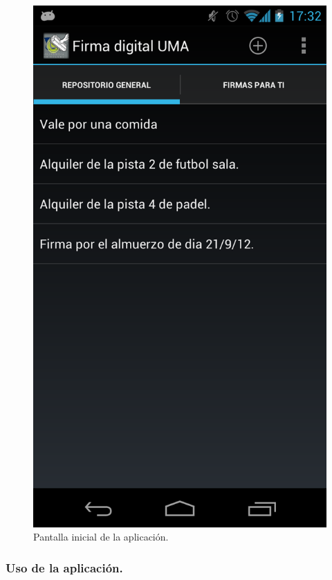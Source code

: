 \begin{figure}[h]
  \centering
    \includegraphics[scale=0.2]{./Android/imagenes/pantallaPrincipal.png}
  \caption{Pantalla inicial de la aplicación.}
  \label{fig:pantallaPrincipal}
\end{figure}

\subsubsection{Uso de la aplicación.}

